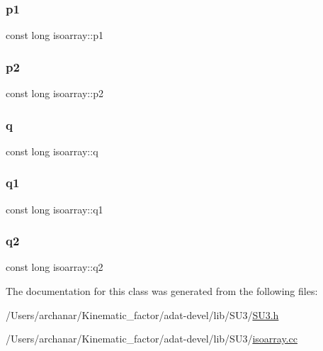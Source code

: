 \mbox{\label{classisoarray_a44a74d2c637cd50b4016fb68f469d674}} 
\subsubsection{\texorpdfstring{p1}{p1}}
{\footnotesize\ttfamily const long isoarray\+::p1}

\mbox{\label{classisoarray_a2c7e4538fd56007f89979d0f1d19f4cf}} 
\subsubsection{\texorpdfstring{p2}{p2}}
{\footnotesize\ttfamily const long isoarray\+::p2}

\mbox{\label{classisoarray_a6ba8b815c26280122084ee9754cfd868}} 
\subsubsection{\texorpdfstring{q}{q}}
{\footnotesize\ttfamily const long isoarray\+::q}

\mbox{\label{classisoarray_a49a8c7ad042720ba0f0251f838a81926}} 
\subsubsection{\texorpdfstring{q1}{q1}}
{\footnotesize\ttfamily const long isoarray\+::q1}

\mbox{\label{classisoarray_a3d08dedb3a7b238fe7a088f8aa54db0b}} 
\subsubsection{\texorpdfstring{q2}{q2}}
{\footnotesize\ttfamily const long isoarray\+::q2}



The documentation for this class was generated from the following files\+:\begin{DoxyCompactItemize}
\item 
/\+Users/archanar/\+Kinematic\+\_\+factor/adat-\/devel/lib/\+S\+U3/\mbox{\hyperlink{adat-devel_2lib_2SU3_2SU3_8h}{S\+U3.\+h}}\item 
/\+Users/archanar/\+Kinematic\+\_\+factor/adat-\/devel/lib/\+S\+U3/\mbox{\hyperlink{adat-devel_2lib_2SU3_2isoarray_8cc}{isoarray.\+cc}}\end{DoxyCompactItemize}
